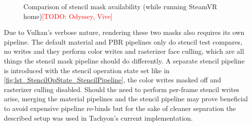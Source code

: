 \begin{figure}[h]
  \centering
  \hspace*{\fill}
  \hfill
  \hspace*{\fill}
  \hspace*{\fill}
  \hfill
  \hspace*{\fill}
     \caption{Comparison of stencil mask availability (while running SteamVR home)\textcolor{red}{[TODO: Odyssey, Vive]}}
     \label{fig:empty_mask}
\end{figure}

Due to Vulkan's verbose nature, rendering these two masks also requires its own pipeline. The default material and PBR pipelines only do stencil test compares, no writes and they perform color writes and rasterizer face culling, which are all things the stencil mask pipeline should do differently. A separate stencil pipeline is introduced with the stencil operation state set like in \autoref{fig:lst_StencilOpState_StencilPipeline}, the color writes masked off and rasterizer culling disabled. Should the need to perform per-frame stencil writes arise, merging the material pipelines and the stencil pipeline may prove beneficial to avoid expensive pipeline re-binds but for the sake of cleaner separation the described setup was used in \gls{Tachyon}'s current implementation. 

